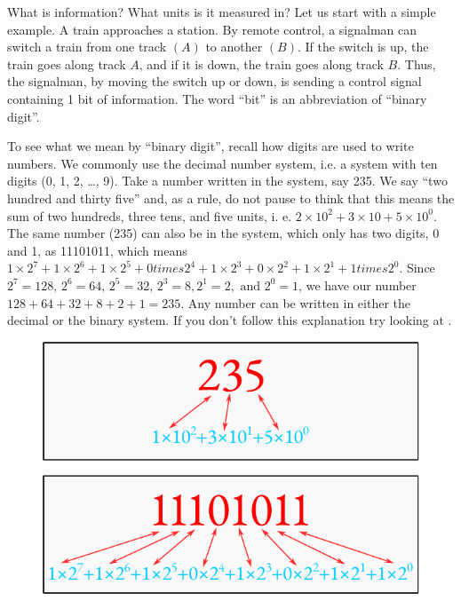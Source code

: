  What is information? What units is it
measured in? Let us start with a simple example. A train approaches
a station. By remote control, a signalman can switch a train from one
track $(A)$ to another $(B)$. If the switch is up, the train goes along track $A$, and if it is down, the train goes along track $B$. Thus, the signalman, by
moving the switch up or down, is sending a control signal containing
1 bit of information. The word ``bit'' is an abbreviation of ``binary digit''.

To see what we mean by ``binary digit'', recall how digits are used to
write numbers. We commonly use the decimal number system, i.e.
a system with ten digits (0, 1, 2, \ldots , 9). Take a number written in the
 system, say 235. We say ``two hundred and thirty five'' and, as
a rule, do not pause to think that this means the sum of two hundreds,
three tens, and five units, i. e. $2 \times 10^{2} + 3 \times 10 + 5 \times 10^{0}$. The same number (235) can also be in the  system, which only has two digits, 0 and 1, as 11101011, which means $1 \times 2^{7} + 1 \times 2^{6} + 1 \times 2^{5} + 0 times 2^{4} + 1 \times 2^{3} + 0 \times 2^{2} + 1 \times 2^{1} + 1 times 2^{0}$. Since $2^{7} = 128, \, 2^{6} = 64, \, 2^{5} = 32, \, 2^{3} = 8, 2^{1} = 2, \,\, \text{and} \,\, 2^{0} = 1$, we have our number $128 + 64 + 32 + 8 + 2 + 1 = 235$. Any number can be written in either the
decimal or the binary system. If you don't follow this explanation try
looking at .

\begin{figure}[!ht]
 \centering
 \includegraphics[width=0.75\linewidth]{figures/binary-conversion.pdf}
 \end{figure}

